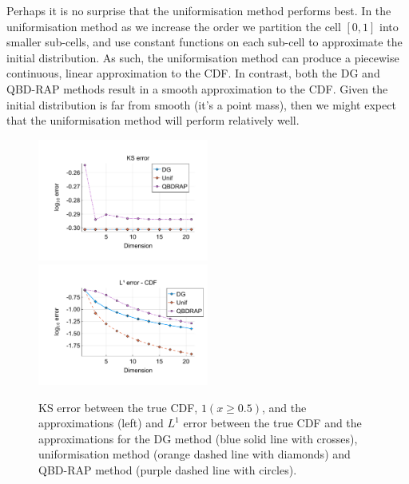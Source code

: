 \begin{example}
Perhaps it is no surprise that the uniformisation method performs best. In the uniformisation method as we increase the order we partition the cell \([0,1]\) into smaller sub-cells, and use constant functions on each sub-cell to approximate the initial distribution. As such, the uniformisation method can produce a piecewise continuous, linear approximation to the CDF. In contrast, both the DG and QBD-RAP methods result in a smooth approximation to the CDF. Given the initial distribution is far from smooth (it's a point mass), then we might expect that the uniformisation method will perform relatively well.
\begin{figure}[h]
	\centering
	\includegraphics[width=0.5\textwidth,trim={1.25cm 0.8cm 0.25cm 1.25cm},clip]{chapter6/figs/comp/fun1/meshs_ks_error_formatted.pdf}%
	\includegraphics[width=0.5\textwidth,trim={1.25cm 0.8cm 0.25cm 1.25cm},clip]{chapter6/figs/comp/fun1/meshs_l1_cdf_error_formatted.pdf}
	\caption{KS error between the true CDF, \(1(x\geq 0.5)\), and the approximations (left) and \(L^1\) error between the true CDF and the approximations for the DG method (blue solid line with crosses), uniformisation method (orange dashed line with diamonds) and QBD-RAP method (purple dashed line with circles).}
	\label{fig: fun 1 comp} 
\end{figure}


\end{example}
